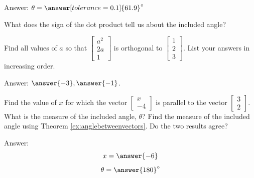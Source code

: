 \documentclass{ximera}
\begin{document}
\begin{problem}
\begin{enumerate}
   Answer: $\theta=\answer[tolerance=0.1]{61.9}^\circ$
   
  
   \end{enumerate}
  \end{problem}
  


\begin{problem}\label{prob:dotproductsign}
What does the sign of the dot product tell us about the included angle?
\end{problem}

\begin{problem}\label{prob:orthvectorsdot}
Find all values of $a$ so that $\begin{bmatrix}a^2\\2a\\1\end{bmatrix}$ is orthogonal to $\begin{bmatrix}1\\2\\3\end{bmatrix}$.  List your answers in increasing order.

Answer: $\answer{-3}, \answer{-1}$.
\end{problem}

\begin{problem}\label{prob:parallelvectdot}
Find the value of $x$ for which the vector $\begin{bmatrix}x\\-4\end{bmatrix}$ is parallel to the vector $\begin{bmatrix}3\\2\end{bmatrix}$. What is the measure of the included angle, $\theta$? Find the measure of the included angle using Theorem \ref{ex:anglebetweenvectors}.  Do the two results agree?

Answer: 
$$x=\answer{-6}$$
$$\theta=\answer{180}^\circ$$
\end{problem}
\end{document}
